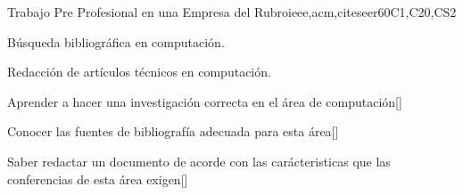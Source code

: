 \begin{syllabus}
\begin{outcomes}
  \item {}
  \item {}
  \item {}
  \item {}
  \item {}
  \item {}
  \item {}
  \item {}
\end{outcomes}
\begin{competences}
    \item {} 
    \item {}
    \item {}
\end{competences}

\begin{unit}{}{Trabajo Pre Profesional en una Empresa del Rubro}{ieee,acm,citeseer}{60}{C1,C20,CS2}
  \begin{topics}
      \item Búsqueda bibliográfica en computación.
      \item Redacción de artículos técnicos en computación.
  \end{topics}
  \begin{learningoutcomes}
      \item Aprender a hacer una investigación correcta en el área de computación[\Usage]
      \item Conocer las fuentes de bibliografía adecuada para esta área[\Usage]
      \item Saber redactar un documento de acorde con las carácteristicas que las conferencias de esta área exigen[\Usage]
  \end{learningoutcomes}
\end{unit}



\begin{coursebibliography}
\end{coursebibliography}

\end{syllabus}
